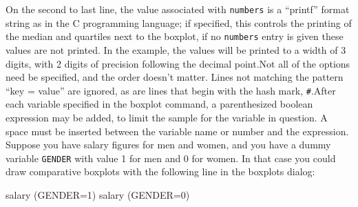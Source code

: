 On the second to last line, the value associated with \verb+numbers+
is a ``printf'' format string as in the C programming language; if
specified, this controls the printing of the median and quartiles next
to the boxplot, if no \verb+numbers+ entry is given these values are
not printed.  In the example, the values will be printed to a width of
3 digits, with 2 digits of precision following the decimal point.Not
all of the options need be specified, and the order doesn't matter.
Lines not matching the pattern ``key = value'' are ignored, as are
lines that begin with the hash mark, \verb+#+.After each variable
specified in the boxplot command, a parenthesized boolean expression
may be added, to limit the sample for the variable in question.  A
space must be inserted between the variable name or number and the
expression.  Suppose you have salary figures for men and women, and
you have a dummy variable \verb+GENDER+ with value 1 for men and 0 for
women.  In that case you could draw comparative boxplots with the
following line in the boxplots dialog:

\begin{code}
      salary (GENDER=1) salary (GENDER=0)
\end{code}


